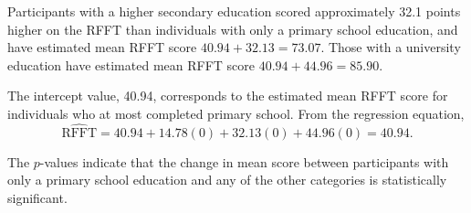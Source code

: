 \begin{example}
Participants with a higher secondary education scored approximately 32.1 points higher on the RFFT than individuals with only a primary school education, and have estimated mean RFFT score $40.94 + 32.13 = 73.07.$ Those with a university education have estimated mean RFFT score $40.94 + 44.96 = 85.90$.  

The intercept value, 40.94, corresponds to the estimated mean RFFT score for individuals who at most completed primary school. From the regression equation, 
\[\widehat{\text{RFFT}} =  40.94 + 14.78(0) + 32.13(0) + 44.96(0) = 40.94. \]

The $p$-values indicate that the change in mean score between participants with only a primary school education and any of the other categories is statistically significant.

\end{example}

